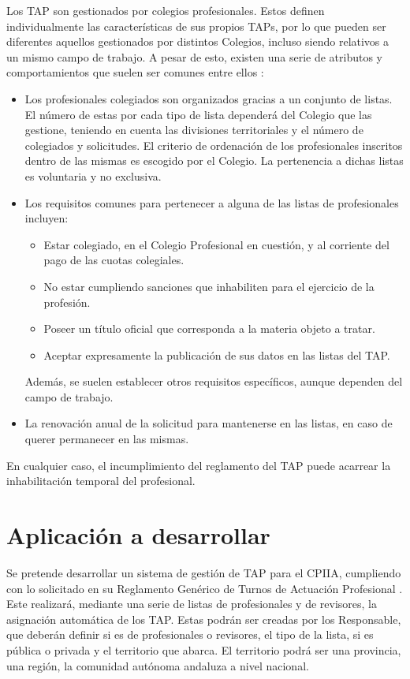 Los TAP son gestionados por colegios profesionales. Estos definen individualmente las características de sus propios TAPs, por lo que pueden ser diferentes aquellos gestionados por distintos Colegios, incluso siendo relativos a un mismo campo de trabajo. A pesar de esto, existen una serie de atributos y comportamientos que suelen ser comunes entre ellos \cite{colegiosinformaticaccii}:
\begin{itemize}
\item Los profesionales colegiados son organizados gracias a un conjunto de listas. El número de estas por cada tipo de lista dependerá del Colegio que las gestione, teniendo en cuenta las divisiones territoriales y el número de colegiados y solicitudes. El criterio de ordenación de los profesionales inscritos dentro de las mismas es escogido por el Colegio. La pertenencia a dichas listas es voluntaria y no exclusiva.
\item Los requisitos comunes para pertenecer a alguna de las listas de profesionales incluyen:
	\begin{itemize}
	\item Estar colegiado, en el Colegio Profesional en cuestión, y al corriente del pago de las cuotas colegiales.
	\item No estar cumpliendo sanciones que inhabiliten para el ejercicio de la profesión.
	\item Poseer un título oficial que corresponda a la materia objeto a tratar.
	\item Aceptar expresamente la publicación de sus datos en las listas del TAP.
	\end{itemize}
Además, se suelen establecer otros requisitos específicos, aunque dependen del campo de trabajo.
\item La renovación anual de la solicitud para mantenerse en las listas, en caso de querer permanecer en las mismas. \\
\end{itemize}

En cualquier caso, el incumplimiento del reglamento del TAP puede acarrear la inhabilitación temporal del profesional.


\section{Aplicación a desarrollar}
Se pretende desarrollar un sistema de gestión de TAP para el CPIIA, cumpliendo con lo solicitado en su Reglamento Genérico de Turnos de Actuación Profesional \cite{reglamentotapcpiia}. Este realizará, mediante una serie de listas de profesionales y de revisores, la asignación automática de los TAP. Estas podrán ser creadas por los Responsable, que deberán definir si es de profesionales o revisores, el tipo de la lista, si es pública o privada y el territorio que abarca. El territorio podrá ser una provincia, una región, la comunidad autónoma andaluza a nivel nacional. \\

